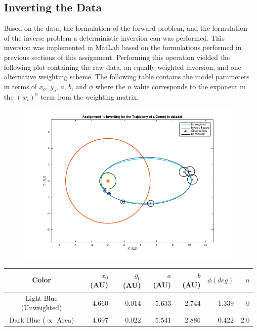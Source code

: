 \documentclass[12pt,runningheads]{article}
\begin{document}
\subsection*{Inverting the Data}
Based on the data, the formulation of the forward problem, and the formulation of the inverse problem a deterministic inversion can was performed. This inversion was implemented in MatLab based on the formulations performed in previous sections of this assignment. Performing this operation yielded the following plot containing the raw data, an equally weighted inversion, and one alternative weighting scheme. The following table contains the model parameters in terms of $x_{o}$, $y_{o}$, $a$, $b$, and $\phi$ where the $n$ value corresponds to the exponent in the $(w_{i})^{n}$ term from the weighting matrix.
\begin{figure}[!h]
\includegraphics[width=\textwidth]{Trajectory.png}
\end{figure}
\begin{center}
\begin{tabular}{|c|rrrrrr|}
\hline
Color & $x_{0}$ (AU) & $y_{0}$ (AU) & $a$ (AU) & $b$ (AU) & $\phi(deg)$ & $n$ \\
\hline
\rule{0pt}{3ex} Light Blue (Unweighted)& $4.660$ & $-0.014$ & $5.633$ & $2.744$ & $1.339$ & $0$\\
Dark Blue ($\propto$ Area) & $4.697$ & $0.022$ & $5.541$ & $2.886$ & $0.422$ & $2.0$ \\
\hline
\end{tabular}
\end{center}
\end{document}
